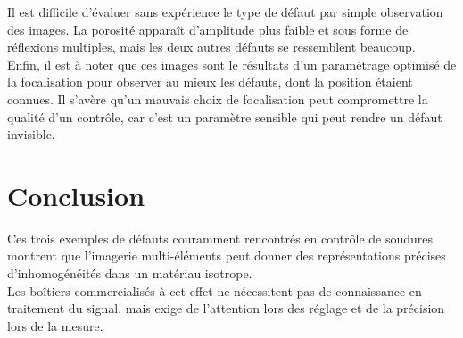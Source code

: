 \documentclass[twoside]{article}
\begin{document}
\begin{multicols}{2}
Il est difficile d'évaluer sans expérience le type de défaut par simple observation des images. La porosité apparaît d'amplitude plus faible et sous forme de réflexions multiples, mais les deux autres défauts se ressemblent beaucoup.\\

Enfin, il est à noter que ces images sont le résultats d'un paramétrage optimisé de la focalisation pour observer au mieux les défauts, dont la position étaient connues. Il s'avère qu'un mauvais choix de focalisation peut compromettre la qualité d'un contrôle, car c'est un paramètre sensible qui peut rendre un défaut invisible.

\section{Conclusion}

Ces trois exemples de défauts couramment rencontrés en contrôle de soudures montrent que l'imagerie multi-éléments peut donner des représentations précises d'inhomogénéités dans un matériau isotrope. \\
Les boîtiers commercialisés à cet effet ne nécessitent pas de connaissance en traitement du signal, mais exige de l'attention lors des réglage et de la précision lors de la mesure.



%
% 


\end{multicols}
\end{document}
